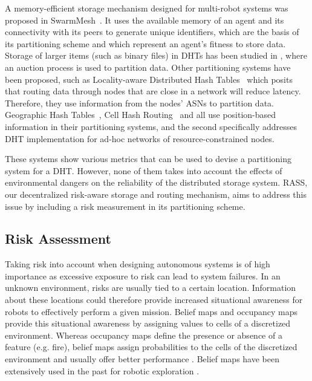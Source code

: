 A memory-efficient storage mechanism designed for multi-robot systems
was proposed in SwarmMesh~\cite{majcherczykSwarmmesh2020}. It
uses the available memory of an agent and its connectivity with its
peers to generate unique identifiers, which are the basis of its
partitioning scheme and which represent an agent's fitness to store
data. Storage of larger items (such as binary files) in \ac{DHT}s has been
studied in \cite{varadharajan2020soul}, where an auction process is
used to partition data.  Other partitioning systems have been
proposed, such as Locality-aware Distributed Hash
Tables~\cite{wu2008ldht} which posits that routing data through nodes
that are close in a network will reduce latency. Therefore, they use
information from the nodes' \ac{ASN}s to
partition data.  Geographic Hash Tables~\cite{ratnasamy2002ght}, Cell
Hash Routing~\cite{araujo2005chr} and \cite{ahullo2008supporting} all
use position-based information in their partitioning systems, and the
second specifically addresses \ac{DHT} implementation for ad-hoc networks
of resource-constrained nodes.

These systems show various metrics that can be used to devise a
partitioning system for a \ac{DHT}. However, none of them takes into
account the effects of environmental dangers on the reliability of the
distributed storage system. \ac{RASS}, our decentralized risk-aware storage and routing mechanism, aims to address this issue by including
a risk measurement in its partitioning scheme.

\subsection{Risk Assessment}

Taking risk into account when designing autonomous systems is of high
importance as excessive exposure to risk can lead to system
failures. In an unknown environment, risks are usually
tied to a certain location. Information about these locations could therefore
provide increased situational awareness for robots to effectively
perform a given mission. Belief maps and occupancy maps provide this
situational awareness by assigning values to cells of a discretized
environment. Whereas occupancy maps define the presence or absence of
a feature (e.g. fire), belief maps assign probabilities to the cells
of the discretized environment and usually offer better performance
\cite{stachnissMappingExplorationMobile2003}. Belief maps have been
extensively used in the past for robotic exploration
\cite{kobayashiSharingExploringInformation2002,
  kobayashiDeterminationExplorationTarget2003,
  indelmanCooperativeMultirobotBelief2018}.


